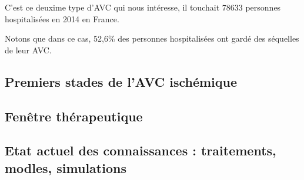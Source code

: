 C'est ce deuxime type d'AVC qui nous int\'eresse, il touchait 78633 personnes hospitalis\'ees en 2014 en France.

\par
Notons que dans ce cas, 52,6\% des personnes hospitalis\'ees ont gard\'e des s\'equelles de leur AVC.

\subsection{Premiers stades de l'AVC isch\'emique}





















\cite{vib_dsc}%
\cite{Duval_JCBFM_02}%

\cite{Durukan_PBB_07}%


\subsection{Fen\^etre th\'erapeutique}



\subsection{Etat actuel des connaissances : traitements, modles, simulations}

\cite{Duval_JCBFM_02}


